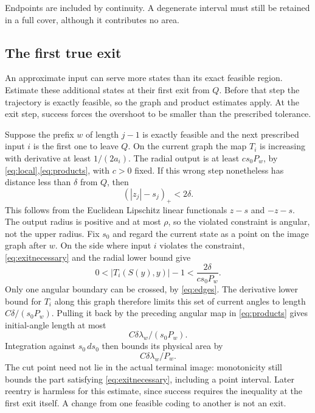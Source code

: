 \documentclass[11pt]{amsart}
\theoremstyle{definition}
\theoremstyle{remark}
\numberwithin{equation}{section}
\begin{document}
Endpoints are included by continuity. A degenerate interval must
still be retained in a full cover, although it contributes no area.
\subsection{The first true exit}
An approximate input can serve more states than its exact feasible
region. Estimate these additional states at their first exit from
$Q$. Before that step the trajectory is exactly feasible, so the
graph and product estimates apply. At the exit step, success forces
the overshoot to be smaller than the prescribed tolerance.

Suppose the prefix \(w\) of length \(j-1\) is exactly feasible and
the next prescribed input \(i\) is the first one to leave $Q$.
On the current graph the map \(T_i\) is increasing with derivative
at least \(1/(2a_i)\). The radial output is at least
\(c s_0P_w\), by \eqref{eq:local},\eqref{eq:products}, with \(c>0\) fixed.
If this wrong step nonetheless has distance less than \(\delta\)
from $Q$, then
\begin{equation}
(|z_j|-s_j)_+<2\delta.                    \label{eq:exitnecessary}
\end{equation}
This follows from the Euclidean Lipschitz linear functionals
\(z-s\) and \(-z-s\). The output radius is positive and at most
\(\rho\), so the violated constraint is angular, not the upper radius.
Fix $s_0$ and regard the current state as a point on the image
graph after $w$. On the side where input $i$ violates the constraint,
\eqref{eq:exitnecessary} and the radial lower bound give
\[
0<|T_i(S(y),y)|-1<\frac{2\delta}{c s_0P_w}.
\]
Only one angular boundary can be crossed, by \eqref{eq:edges}.
The derivative lower bound for $T_i$ along this graph therefore
limits this set of current angles to length
$C\delta/(s_0P_w)$. Pulling it back by the preceding angular map
in \eqref{eq:products} gives initial-angle length at most
\[
                         C\delta\lambda_w/(s_0P_w).
\]
Integration against \(s_0\,ds_0\) then bounds its physical area by
\begin{equation}
C\delta\lambda_w/P_w.     \label{eq:exitarea}
\end{equation}
The cut point need not lie in the actual terminal image:
monotonicity still bounds the part satisfying
\eqref{eq:exitnecessary}, including a point interval. Later reentry
is harmless for this estimate, since success requires the inequality
at the first exit itself. A change from one feasible coding to
another is not an exit.
\end{document}
